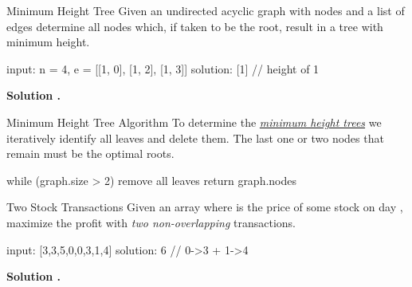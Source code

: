 \documentclass{cognito}
\begin{document}
\begin{note}{Minimum Height Tree}
	Given an undirected acyclic graph with  nodes and a list of edges 
	determine all nodes which, if taken to be the root, result in a tree with minimum height.

	\begin{largecode}
 input: n = 4, e = [[1, 0], [1, 2], [1, 3]]
 solution: [1]  // height of 1
	\end{largecode}
	\bf Solution \hyperref[note:Minimum Height Tree Algorithm]{\solutionref}.
\end{note}

\begin{note}{Minimum Height Tree Algorithm}
	To determine the \hyperref[note:Minimum Height Tree]{\it minimum height trees}
	we iteratively identify all leaves and delete them. The last one or two nodes that remain
	must be the optimal roots.

	\begin{largecode}
 while (graph.size > 2)
	remove all leaves
 return graph.nodes
	\end{largecode}
	\vspace{-5pt}
\end{note}



\begin{note}{Two Stock Transactions}
	Given an array where  is the price of some stock on day ,
	maximize the profit with {\it two non-overlapping} transactions.
	
	\begin{largecode}
 input: [3,3,5,0,0,3,1,4]
 solution: 6  // 0->3 + 1->4
	\end{largecode}
	\bf Solution \hyperref[note:Linear Two Stock Optimization]{\solutionref}.
\end{note}
\end{document}
